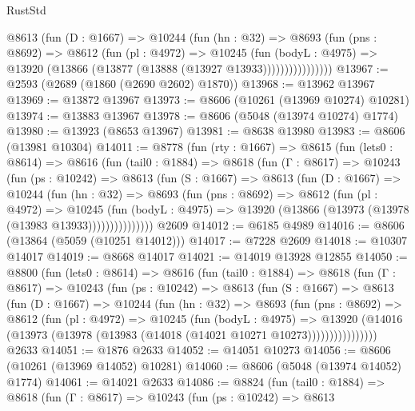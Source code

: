 \begin{lexlean}{RustStd}
\begin{coremodule}
                @8613
                  (fun (D : @1667) =>
                  @10244
                    (fun (hn : @32) =>
                    @8693
                      (fun (pns : @8692) =>
                      @8612
                        (fun (pl : @4972) =>
                        @10245
                          (fun (bodyL : @4975) =>
                          @13920 (@13866 (@13877 (@13888 (@13927 @13933))))))))))))))))
@13967 := @2593 (@2689 (@1860 (@2690 @2602) @1870))
@13968 := @13962 @13967
@13969 := @13872 @13967
@13973 := @8606 (@10261 (@13969 @10274) @10281)
@13974 := @13883 @13967
@13978 := @8606 (@5048 (@13974 @10274) @1774)
@13980 := @13923 (@8653 @13967)
@13981 := @8638 @13980
@13983 := @8606 (@13981 @10304)
@14011 := @8778
    (fun (rty : @1667) =>
    @8615
      (fun (lets0 : @8614) =>
      @8616
        (fun (tail0 : @1884) =>
        @8618
          (fun (Γ : @8617) =>
          @10243
            (fun (ps : @10242) =>
            @8613
              (fun (S : @1667) =>
              @8613
                (fun (D : @1667) =>
                @10244
                  (fun (hn : @32) =>
                  @8693
                    (fun (pns : @8692) =>
                    @8612
                      (fun (pl : @4972) =>
                      @10245
                        (fun (bodyL : @4975) =>
                        @13920 (@13866 (@13973 (@13978 (@13983 @13933)))))))))))))))
    @2609
@14012 := @6185 @4989
@14016 := @8606 (@13864 (@5059 (@10251 @14012)))
@14017 := @7228 @2609
@14018 := @10307 @14017
@14019 := @8668 @14017
@14021 := @14019 @13928 @12855
@14050 := @8800
    (fun (lets0 : @8614) =>
    @8616
      (fun (tail0 : @1884) =>
      @8618
        (fun (Γ : @8617) =>
        @10243
          (fun (ps : @10242) =>
          @8613
            (fun (S : @1667) =>
            @8613
              (fun (D : @1667) =>
              @10244
                (fun (hn : @32) =>
                @8693
                  (fun (pns : @8692) =>
                  @8612
                    (fun (pl : @4972) =>
                    @10245
                      (fun (bodyL : @4975) =>
                      @13920
                        (@14016
                          (@13973 (@13978 (@13983 (@14018 (@14021 @10271 @10273))))))))))))))))
    @2633
@14051 := @1876 @2633
@14052 := @14051 @10273
@14056 := @8606 (@10261 (@13969 @14052) @10281)
@14060 := @8606 (@5048 (@13974 @14052) @1774)
@14061 := @14021 @2633
@14086 := @8824
    (fun (tail0 : @1884) =>
    @8618
      (fun (Γ : @8617) =>
      @10243
        (fun (ps : @10242) =>
        @8613

\end{coremodule}
\end{lexlean}
